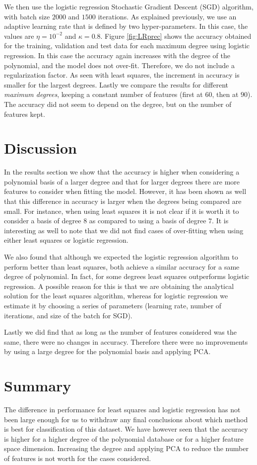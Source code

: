 \documentclass[10pt,conference,compsocconf]{IEEEtran}
\begin{document}
    We then use the logistic regression Stochastic Gradient Descent (SGD) algorithm, with batch size $2000$ and $1500$ iterations. As explained previously, we use an adaptive learning rate that is defined by two hyper-parameters. In this case, the values are $\eta = 10^{-2}$ and $\kappa = 0.8$. Figure \ref{fig:LRprec} shows the accuracy obtained for the training, validation and test data for each maximum degree using logistic regression.
    In this case the accuracy again increases with the degree of the polynomial, and the model does not over-fit. Therefore, we do not include a regularization factor. As seen with least squares, the increment in accuracy is smaller for the largest degrees. Lastly we compare the results for different \emph{maximum degrees}, keeping a constant number of features (first at $60$, then at $90$). The accuracy did not seem to depend on the degree, but on the number of features kept.

\section{Discussion}
\label{sec:discussion}
  In the results section we show that the accuracy is higher when considering a polynomial basis of a larger degree and that for larger degrees there are more features to consider when fitting the model. However, it has been shown as well that this difference in accuracy is larger when the degrees being compared are small. For instance, when using least squares it is not clear if it is worth it to consider a basis of degree $8$ as compared to using a basis of degree $7$. It is interesting as well to note that we did not find cases of over-fitting when using either least squares or logistic regression.

  We also found that although we expected the logistic regression algorithm to perform better than least squares, both achieve a similar accuracy for a same degree of polynomial. In fact, for some degrees least squares outperforms logistic regression. A possible reason for this is that we are obtaining the analytical solution for the least squares algorithm, whereas for logistic regression we estimate it by choosing a series of parameters (learning rate, number of iterations, and size of the batch for SGD).

  Lastly we did find that as long as the number of features considered was the same, there were no changes in accuracy. Therefore there were no improvements by using a large degree for the polynomial basis and applying PCA.

\section{Summary}
\label{sec:tips-writing}
  The difference in performance for least squares and logistic regression has not been large enough for us to withdraw any final conclusions about which method is best for classification of this dataset. We have however seen that the accuracy is higher for a higher degree of the polynomial database or for a higher feature space dimension. Increasing the degree and applying PCA to reduce the number of features is not worth for the cases considered.



\end{document}
